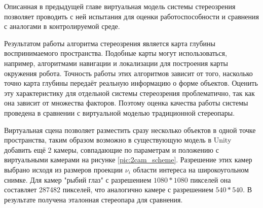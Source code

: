 Описанная в предыдущей главе виртуальная модель системы стереозрения позволяет проводить 
с ней испытания для оценки работоспособности и сравнения с аналогами в контролируемой среде.            %

Результатом работы алгоритма стереозрения является карта глубины воспринимаемого пространства. Подобные карты могут
использоваться, например, алгоритмами навигации и локализации для построения карты окружения робота. Точность работы 
этих алгоритмов зависит от того, насколько точно карта глубины передаёт реальную информацию о форме объектов. Оценить 
эту характеристику для отдельной системы стереозрения проблематично, так как она зависит от множества факторов.         %
Поэтому оценка качества работы системы проведена в сравнении с виртуальной моделью традиционной стереопары.

Виртуальная сцена позволяет разместить сразу несколько объектов в одной точке пространства, таким образом возможно
в существующую модель в Unity добавить ещё 2 камеры, совпадающие по параметрам и положению с виртуальными камерами на 
рисунке \ref{pic:2cam_scheme}. Разрешение этих камер выбрано исходя из размеров проекции $\nu_i$ области интереса на широкоугольном
снимке. Для камер "рыбий глаз" с разрешением $1080*1080$ пикселей она составляет 287482 пикселей, что аналогично камере 
с разрешением $540*540$.  В результате получена эталонная стереопара для сравнения. %

